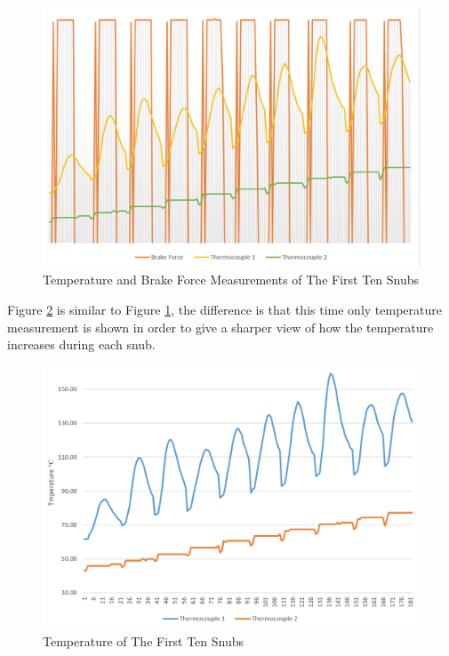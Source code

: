 		\begin{figure}[htbp]
				\centering
				\includegraphics[width=.8\textwidth]{figuras/fig-test-first-ten-snubs-force-temperature}
				\caption{Temperature and Brake Force Measurements of The First Ten Snubs}
				\label{fig:test-first-ten-snubs-force-temperature}
		\end{figure}

		Figure \ref{fig:test-first-ten-snubs-temperature} is similar to Figure \ref{fig:test-first-ten-snubs-force-temperature}, the difference is that this time only temperature measurement is shown in order to give a sharper view of how the temperature increases during each snub.

		\begin{figure}[htbp]
				\centering
				\includegraphics[width=.8\textwidth]{figuras/fig-test-first-ten-snubs-temperature}
				\caption{Temperature of The First Ten Snubs}
				\label{fig:test-first-ten-snubs-temperature}
		\end{figure}

